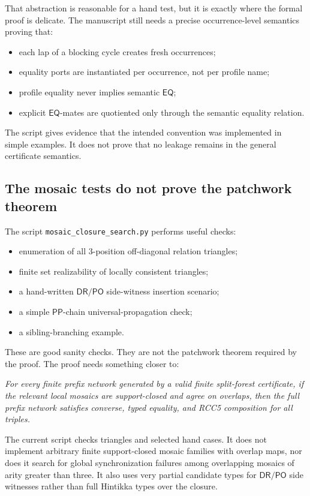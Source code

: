 \documentclass[11pt]{article}
\newcommand{\PP}{\mathsf{PP}}
\newcommand{\PO}{\mathsf{PO}}
\newcommand{\DR}{\mathsf{DR}}
\newcommand{\EQ}{\mathsf{EQ}}
\begin{document}
That abstraction is reasonable for a hand test, but it is exactly where the formal proof is delicate.  The manuscript still needs a precise occurrence-level semantics proving that:
\begin{itemize}
\item each lap of a blocking cycle creates fresh occurrences;
\item equality ports are instantiated per occurrence, not per profile name;
\item profile equality never implies semantic \(\EQ\);
\item explicit \(\EQ\)-mates are quotiented only through the semantic equality relation.
\end{itemize}
The script gives evidence that the intended convention was implemented in simple examples.  It does not prove that no leakage remains in the general certificate semantics.

\subsection{The mosaic tests do not prove the patchwork theorem}

The script \texttt{mosaic\_closure\_search.py} performs useful checks:
\begin{itemize}
\item enumeration of all 3-position off-diagonal relation triangles;
\item finite set realizability of locally consistent triangles;
\item a hand-written \(\DR/\PO\) side-witness insertion scenario;
\item a simple \(\PP\)-chain universal-propagation check;
\item a sibling-branching example.
\end{itemize}

These are good sanity checks.  They are not the patchwork theorem required by the proof.  The proof needs something closer to:

\medskip
\noindent\emph{For every finite prefix network generated by a valid finite split-forest certificate, if the relevant local mosaics are support-closed and agree on overlaps, then the full prefix network satisfies converse, typed equality, and RCC5 composition for all triples.}

\medskip
The current script checks triangles and selected hand cases.  It does not implement arbitrary finite support-closed mosaic families with overlap maps, nor does it search for global synchronization failures among overlapping mosaics of arity greater than three.  It also uses very partial candidate types for \(\DR/\PO\) side witnesses rather than full Hintikka types over the closure.
\end{document}
